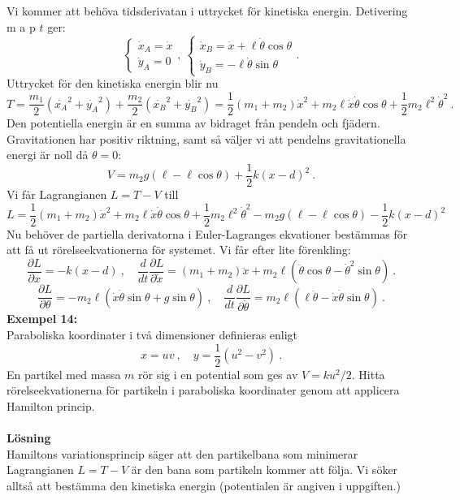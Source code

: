 \documentclass{article}
\begin{document}
Vi kommer att behöva tidsderivatan i uttrycket för kinetiska energin. Detivering m a p $t$ ger:
\begin{equation*}
    \begin{cases}
        \dot{x}_A=\dot{x}\\
        \dot{y}_A=0
    \end{cases}, \ 
    \begin{cases}
      \dot{x}_B=\dot{x}+\ell\dot{\theta}\cos\theta\\
      \dot{y}_B=-\ell\dot{\theta}\sin\theta
    \end{cases}.
\end{equation*}
Uttrycket för den kinetiska energin blir nu
$$
T=\frac{m_1}{2}(\dot{x_A}^2+\dot{y_A}^2)+\frac{m_2}{2}(\dot{x_B}^2+\dot{y_B}^2) =\frac{1}{2}(m_1+m_2)\dot{x}^2+m_2\ell\dot{x}\dot{\theta}\cos\theta+\frac{1}{2}m_2\ell^2\dot{\theta}^2 \ .
$$
Den potentiella energin är en summa av bidraget från pendeln och fjädern. Gravitationen har positiv riktning, samt så väljer vi att pendelns gravitationella energi är noll då $\theta=0$:
$$
V=m_2g(\ell-\ell\cos\theta)+\frac{1}{2}k(x-d)^2 \ .
$$
Vi får Lagrangianen $L=T-V$ till 
$$
L=\frac{1}{2}(m_1+m_2)\dot{x}^2+m_2\ell\dot{x}\dot{\theta}\cos\theta+\frac{1}{2}m_2\ell^2\dot{\theta}^2-m_2g(\ell-\ell\cos\theta)-\frac{1}{2}k(x-d)^2 
$$
Nu behöver de partiella derivatorna i Euler-Lagranges ekvationer bestämmas för att få ut rörelseekvationerna för systemet. Vi får efter lite förenkling:
$$
\frac{\partial L}{\partial x}=-k(x-d) \ , \quad \frac{d}{dt}\frac{\partial L}{\partial \dot{x}}=(m_1+m_2)\ddot{x}+m_2\ell(\ddot{\theta}\cos\theta-\dot{\theta}^2\sin\theta) \ .
$$
$$
\frac{\partial L}{\partial\theta}=-m_2\ell(\dot{x}\dot{\theta}\sin\theta+g\sin\theta) \ , \quad \frac{d}{dt}\frac{\partial L}{\partial \dot{\theta}}=m_2\ell(\ell\ddot{\theta}-\dot{x}\dot{\theta}\sin\theta) \ .
$$
\newpage
\noindent
\textbf{Exempel 14:}\\
Paraboliska koordinater i två dimensioner definieras enligt
$$
x=uv \ , \quad y=\frac{1}{2}(u^2-v^2) \ .
$$
En partikel med massa $m$ rör sig i en potential som ges av $V=ku^2/2$. Hitta rörelseekvationerna för partikeln i paraboliska koordinater genom att applicera Hamilton princip.\\ \\
\textbf{Lösning}\\
Hamiltons variationsprincip säger att den partikelbana som minimerar Lagrangianen $L=T-V$ är den bana som partikeln kommer att följa. Vi söker alltså att bestämma den kinetiska energin (potentialen är angiven i uppgiften.)
\end{document}
